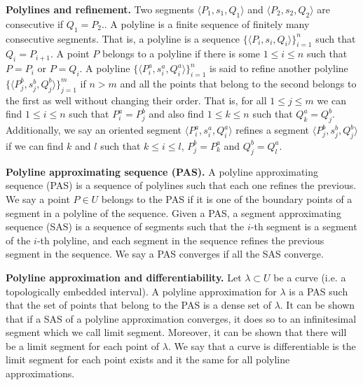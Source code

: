 \documentclass[10pt, onecolumn, longbibliography, nofootinbib]{revtex4-2}
\begin{document}
\textbf{Polylines and refinement.} Two segments $\langle P_1, s_1, Q_1 \rangle$ and $\langle P_2, s_2, Q_2 \rangle$ are consecutive if $Q_1 = P_2$..  A polyline is a finite sequence of finitely many consecutive segments. That is, a polyline is a sequence $\{\langle P_i, s_i, Q_i \rangle\}_{i=1}^{n}$ such that $Q_i = P_{i+1}$. A point $P$ belongs to a polyline if there is some $1 \leq i \leq n$ such that $P=P_i$ or $P=Q_i$. A polyline $\{\langle P^a_i, s^a_i, Q^a_i \rangle\}_{i=1}^{n}$ is said to refine another polyline $\{\langle P^b_j, s^b_j, Q^b_j \rangle\}_{j=1}^{m}$ if $n > m$ and all the points that belong to the second belongs to the first as well without changing their order. That is, for all $1 \leq j \leq m$ we can find $1 \leq i \leq n$ such that $P^a_i = P^b_j$ and also find $1 \leq k \leq n$ such that $Q^a_k = Q^b_j$. Additionally, we say an oriented segment $\langle P^a_i, s^a_i, Q^a_i \rangle$ refines a segment $\langle P^b_j, s^b_j, Q^b_j \rangle$ if we can find $k$ and $l$ such that $k \leq i \leq l$, $P^b_j = P^a_k$ and $Q^b_j = Q^a_l$.

\textbf{Polyline approximating sequence (PAS).} A polyline approximating sequence (PAS) is a sequence of polylines such that each one refines the previous. We say a point $P \in U$ belongs to the PAS if it is one of the boundary points of a segment in a polyline of the sequence. Given a PAS, a segment approximating sequence (SAS) is a sequence of segments such that the $i$-th segment is a segment of the $i$-th polyline, and each segment in the sequence refines the previous segment in the sequence. We say a PAS converges if all the SAS converge.

\textbf{Polyline approximation and differentiability.} Let $\lambda \subset U$ be a curve (i.e. a topologically embedded interval). A polyline approximation for $\lambda$ is a PAS such that the set of points that belong to the PAS is a dense set of $\lambda$. It can be shown that if a SAS of a polyline approximation converges, it does so to an infinitesimal segment which we call limit segment. Moreover, it can be shown that there will be a limit segment for each point of $\lambda$. We say that a curve is differentiable is the limit segment for each point exists and it the same for all polyline approximations.


\end{document}
